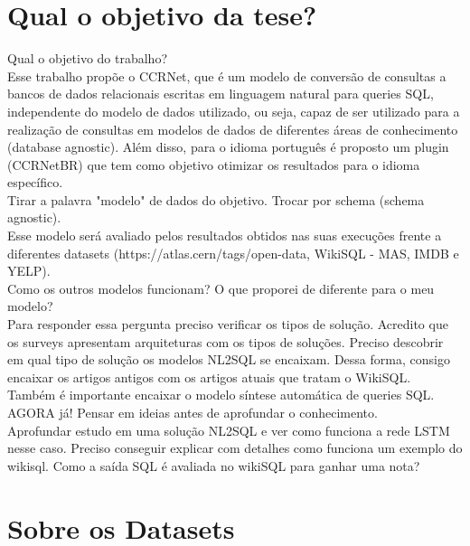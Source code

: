 \documentclass{article}
\begin{document}
\section{Qual o objetivo da tese?}

Qual o objetivo do trabalho?\\

Esse trabalho propõe o CCRNet, que é um modelo de conversão de consultas a bancos de dados relacionais escritas em linguagem natural para queries SQL, independente do modelo de dados utilizado, ou seja, capaz de ser utilizado para a realização de consultas em modelos de dados de diferentes áreas de conhecimento (database agnostic). Além disso, para o idioma português é proposto um plugin (CCRNetBR) que tem como objetivo otimizar os resultados para o idioma específico.\\

Tirar a palavra "modelo" de dados do objetivo. Trocar por schema (schema agnostic).\\

Esse modelo será avaliado pelos resultados obtidos nas suas execuções frente a diferentes datasets (https://atlas.cern/tags/open-data, WikiSQL - MAS, IMDB e YELP).\\

Como os outros modelos funcionam? O que proporei de diferente para o meu modelo?\\

Para responder essa pergunta preciso verificar os tipos de solução. Acredito que os surveys apresentam arquiteturas com os tipos de soluções. Preciso descobrir em qual tipo de solução os modelos NL2SQL se encaixam. Dessa forma, consigo encaixar os artigos antigos com os artigos atuais que tratam o WikiSQL.\\

Também é importante encaixar o modelo síntese automática de queries SQL.\\

AGORA já! Pensar em ideias antes de aprofundar o conhecimento.\\

Aprofundar estudo em uma solução NL2SQL e ver como funciona a rede LSTM nesse caso. Preciso conseguir explicar com detalhes como funciona um exemplo do wikisql. Como a saída SQL é avaliada no wikiSQL para ganhar uma nota?\\

\section{Sobre os Datasets}
\end{document}
